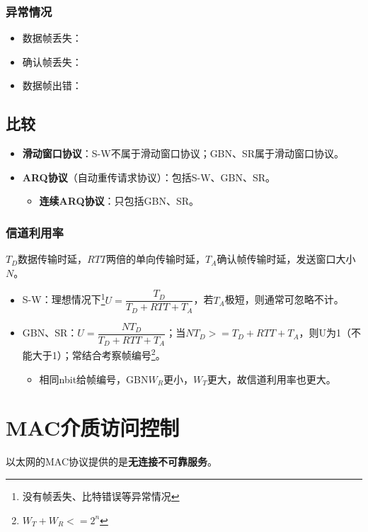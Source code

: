 \subsubsection{异常情况}
\begin{itemize}
    \item 数据帧丢失：
    \item 确认帧丢失：
    \item 数据帧出错：
\end{itemize}


\subsection{比较}
\begin{itemize}
    \item \textbf{滑动窗口协议}：S-W不属于滑动窗口协议；GBN、SR属于滑动窗口协议。
    \item \textbf{ARQ协议}（自动重传请求协议）：包括S-W、GBN、SR。\begin{itemize}
        \item \textbf{连续ARQ协议}：只包括GBN、SR。
    \end{itemize}
\end{itemize}

\subsubsection{信道利用率}
\(T_D\)数据传输时延，\(RTT\)两倍的单向传输时延，\(T_A\)确认帧传输时延，发送窗口大小\(N\)。
\begin{itemize}
    \item S-W：理想情况下\footnote{没有帧丢失、比特错误等异常情况}\(U = \dfrac{T_D}{T_D + RTT + T_A}\)，若\(T_A\)极短，则通常可忽略不计。
    \item GBN、SR：\(U = \dfrac{NT_D}{T_D + RTT + T_A}\)；当\(NT_D >= T_D + RTT + T_A\)，则U为1（不能大于1）；常结合考察帧编号\footnote{\(W_T + W_R <= 2^n\)}。
    \begin{itemize}
        \item 相同nbit给帧编号，GBN\(W_R\)更小，\(W_T\)更大，故信道利用率也更大。
    \end{itemize}
\end{itemize}


\section{MAC介质访问控制}

以太网的MAC协议提供的是\textbf{无连接不可靠服务}。

